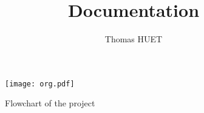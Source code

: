 \documentclass[a4paper]{article}
\title{Documentation}
\author{Thomas HUET}
\begin{document}
\maketitle

\tableofcontents

\begin{landscape}
\begin{figure}
  \begin{center}
    \texttt{[image: org.pdf]}
  \end{center}
  \caption{Flowchart of the project}
\end{figure}
\end{landscape}


\end{document}
